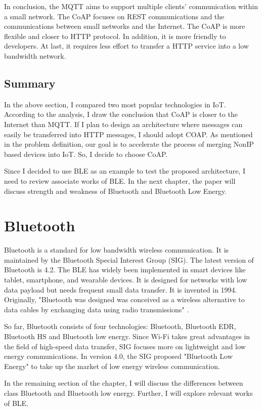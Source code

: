 \documentclass{Nan_Thesis}
\begin{document}
In conclusion, the MQTT aims to support multiple clients’ communication within a small network. The CoAP focuses on REST communications and the communications between small networks and the Internet. The CoAP is more flexible and closer to HTTP protocol. In addition, it is more friendly to developers. At last, it requires less effort to transfer a HTTP service into a low bandwidth network. 
\subsection{Summary}
In the above section, I compared two most popular technologies in IoT. According to the analysis, I draw the conclusion that CoAP is closer to the Internet than MQTT. If I plan to design an architecture where messages can easily be transferred into HTTP messages, I should adopt COAP.  As mentioned in the problem definition, our goal is to accelerate the process of merging NonIP based devices into IoT. So, I decide to choose CoAP.  

Since I decided to use BLE as an example to test the proposed architecture, I need to review associate works of BLE. In the next chapter, the paper will discuss strength and weakness of Bluetooth and Bluetooth Low Energy.

\section{Bluetooth}
Bluetooth is a standard for low bandwidth wireless communication. It is maintained by the Bluetooth Special Interest Group (SIG). The latest version of Bluetooth is 4.2. The BLE has widely been implemented in smart devices like tablet, smartphone, and wearable devices. It is designed for networks with low data payload but needs frequent small data transfer. It is invented in 1994. Originally, "Bluetooth was designed was conceived as a wireless alternative to data cables by exchanging data using radio transmissions" \cite{Bluetooth2016SIG}.

So far, Bluetooth consists of four technologies: Bluetooth, Bluetooth EDR, Bluetooth HS and Bluetooth low energy. Since Wi-Fi takes great advantages in the field of high-speed data transfer, SIG focuses more on lightweight and low energy communications. In version 4.0, the SIG proposed "Bluetooth Low Energy" to take up the market of low energy wireless communication.

In the remaining section of the chapter, I will discuss the differences between class Bluetooth and Bluetooth low energy. Further, I will explore relevant works of BLE.
\end{document}
